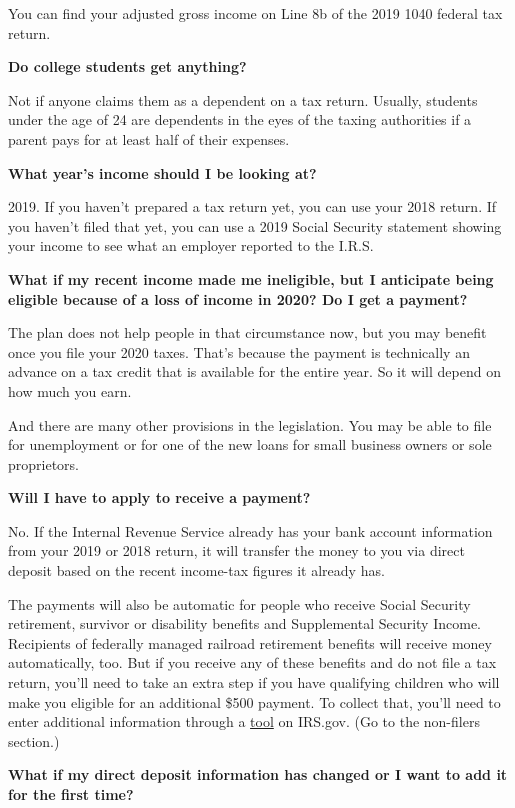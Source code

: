 You can find your adjusted gross income on Line 8b of the 2019 1040
federal tax return.

\textbf{Do college students get anything?}

Not if anyone claims them as a dependent on a tax return. Usually,
students under the age of 24 are dependents in the eyes of the taxing
authorities if a parent pays for at least half of their expenses.

\textbf{What year's income should I be looking at?}

2019. If you haven't prepared a tax return yet, you can use your 2018
return. If you haven't filed that yet, you can use a 2019 Social
Security statement showing your income to see what an employer reported
to the I.R.S.

\textbf{What if my recent income made me ineligible, but I anticipate
being eligible because of a loss of income in 2020? Do I get a payment?}

The plan does not help people in that circumstance now, but you may
benefit once you file your 2020 taxes. That's because the payment is
technically an advance on a tax credit that is available for the entire
year. So it will depend on how much you earn.

And there are many other provisions in the legislation. You may be able
to file for unemployment or for one of the new loans for small business
owners or sole proprietors.

\textbf{Will I have to apply to receive a payment?}

No. If the Internal Revenue Service already has your bank account
information from your 2019 or 2018 return, it will transfer the money to
you via direct deposit based on the recent income-tax figures it already
has.

The payments will also be automatic for people who receive Social
Security retirement, survivor or disability benefits and Supplemental
Security Income. Recipients of federally managed railroad retirement
benefits will receive money automatically, too. But if you receive any
of these benefits and do not file a tax return, you'll need to take an
extra step if you have qualifying children who will make you eligible
for an additional \$500 payment. To collect that, you'll need to enter
additional information through a
\href{http://www.irs.gov/coronavirus/economic-impact-payments}{tool} on
IRS.gov. (Go to the non-filers section.)

\textbf{What if my direct deposit information has changed or I want to
add it for the first time?}

